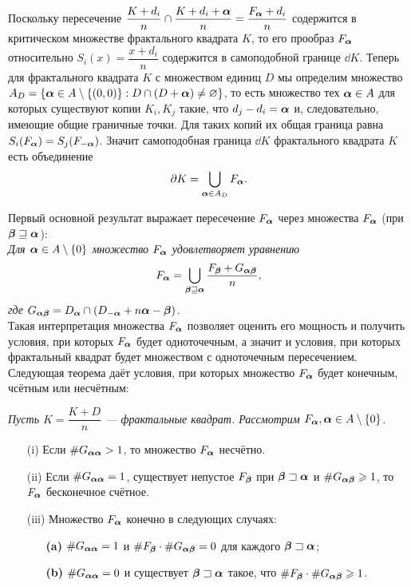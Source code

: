 Поскольку пересечение $\dfrac{K+d_i}{n}\cap\dfrac{K+d_i+{\bm{\alpha}}}{n}=\dfrac{F_{\bm{\alpha}}+d_i}{n}$ содержится в критическом множестве фрактального квадрата $K$, то его прообраз $F_{\bm{\alpha}}$ относительно $S_i(x)=\dfrac{x+d_i}{n}$ содержится в самоподобной границе $\dd K$.
Теперь для фрактального квадрата $K$ с множеством единиц $D$ мы определим множество 
$A_D=\{{\bm{\alpha}}\in A\setminus\{(0,0)\}: D\cap(D+{\bm{\alpha}})\neq\varnothing\}$, то есть множество тех ${\bm{\alpha}}\in A$ для которых существуют копии $K_i, K_j$ такие, что $d_j-d_i={\bm{\alpha}}$ и, следовательно, имеющие общие граничные точки. 
Для таких копий их общая граница равна $S_i(F_{\bm{\alpha}})=S_j(F_{-{\bm{\alpha}}})$. 
Значит самоподобная граница $\dd K$ фрактального квадрата $K$ есть объединение
$$\partial K=\bigcup\limits_{{\bm{\alpha}}\in A_D}F_{\bm{\alpha}}.$$

Первый основной результат выражает пересечение $F_{\bm{\alpha}}$ через множества $F_{\bm{\alpha}}$ (при ${\bm{\beta}}\sqsupseteq{\bm{\alpha}}$):\\

{\em Для ${\bm{\alpha}}\in A\setminus\{0\}$ множество $F_{\bm{\alpha}}$ удовлетворяет уравнению
$$ F_{\bm{\alpha}}=\bigcup\limits_{{\bm{\beta}}\sqsupseteq{\bm{\alpha}}} \dfrac{F_{\bm{\beta}}+G_{{\bm{\alpha}}{\bm{\beta}}}}{n},$$
где $G_{{\bm{\alpha}}{\bm{\beta}}}=D_{\bm{\alpha}}\cap(D_{-{\bm{\alpha}}}+n{\bm{\alpha}}-{\bm{\beta}})$.}\\

Такая интерпретация множества $F_{\bm{\alpha}}$ позволяет оценить его мощность и получить условия, при которых $F_{\bm{\alpha}}$ будет одноточечным, а значит и условия, при которых фрактальный квадрат будет множеством с одноточечным пересечением.
Следующая теорема даёт условия, при которых множество $F_{\bm{\alpha}}$ будет конечным, чсётным или несчётным:

{\em Пусть $K=\dfrac{K+D}{n}$ --- фрактальные квадрат. Рассмотрим $F_{\bm{\alpha}}, {\bm{\alpha}}\in A\setminus\{0\}$.
\begin{itemize}[nolistsep]
 \item[(i)] Если $\#G_{{\bm{\alpha}}{\bm{\alpha}}}> 1$, то множество $F_{\bm{\alpha}}$ несчётно.
 \item[(ii)] Если $\#G_{{\bm{\alpha}}{\bm{\alpha}}}=1$, существует непустое $F_{\bm{\beta}}$ при ${\bm{\beta}}\sqsupset{\bm{\alpha}}$ и $\#G_{{\bm{\alpha}}{\bm{\beta}}}\geqslant1$, то $F_{\bm{\alpha}}$ бесконечное счётное.
 \item[(iii)] Множество $F_{\bm{\alpha}}$ конечно в следующих случаях:
 \begin{itemize}[nolistsep]
 \item[\textbf{(a)}] $\#G_{{\bm{\alpha}}{\bm{\alpha}}}=1$ и $\#F_{\bm{\beta}}\cdot\#G_{{\bm{\alpha}}{\bm{\beta}}}=0$ для каждого ${\bm{\beta}}\sqsupset{\bm{\alpha}}$;
 \item[\textbf{(b)}] $\#G_{{\bm{\alpha}}{\bm{\alpha}}}=0$ и существует ${\bm{\beta}}\sqsupset{\bm{\alpha}}$ такое, что $\#F_{\bm{\beta}}\cdot\#G_{{\bm{\alpha}}{\bm{\beta}}}\geqslant1$.
 \end{itemize}
\end{itemize}}

